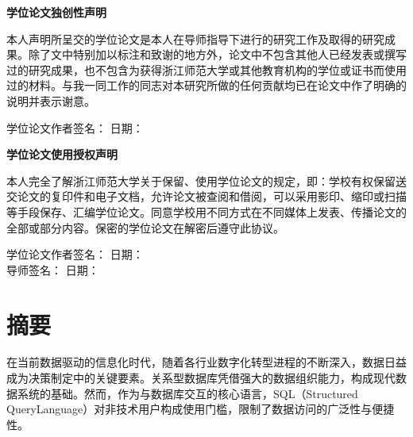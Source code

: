 \documentclass[12pt,a4paper,openright,UTF8]{ctexbook}
\begin{document}
\newpage
\thispagestyle{empty}
\begin{center}
    {\bfseries 学位论文独创性声明}
\end{center}
\vspace{1cm}
本人声明所呈交的学位论文是本人在导师指导下进行的研究工作及取得的研究成果。除了文中特别加以标注和致谢的地方外，论文中不包含其他人已经发表或撰写过的研究成果，也不包含为获得浙江师范大学或其他教育机构的学位或证书而使用过的材料。与我一同工作的同志对本研究所做的任何贡献均已在论文中作了明确的说明并表示谢意。
\vspace{2cm}
\begin{flushright}
    学位论文作者签名：\underline{\hspace{4cm}} \quad 日期：\underline{\hspace{3cm}}
\end{flushright}

\newpage
\thispagestyle{empty}
\begin{center}
    {\bfseries 学位论文使用授权声明}
\end{center}
\vspace{1cm}
本人完全了解浙江师范大学关于保留、使用学位论文的规定，即：学校有权保留送交论文的复印件和电子文档，允许论文被查阅和借阅，可以采用影印、缩印或扫描等手段保存、汇编学位论文。同意学校用不同方式在不同媒体上发表、传播论文的全部或部分内容。保密的学位论文在解密后遵守此协议。
\vspace{2cm}
\begin{flushright}
    学位论文作者签名：\underline{\hspace{4cm}} \quad 日期：\underline{\hspace{3cm}} \\[1cm]
    导师签名：\underline{\hspace{4.6cm}} \quad 日期：\underline{\hspace{3cm}}
\end{flushright}

\newpage
{}
\setcounter{page}{1}


\chapter*{摘\quad 要}

在当前数据驱动的信息化时代，随着各行业数字化转型进程的不断深入，数据日益成为决策制定中的关键要素。关系型数据库凭借强大的数据组织能力，构成现代数据系统的基础。然而，作为与数据库交互的核心语言，SQL（Structured QueryLanguage）对非技术用户构成使用门槛，限制了数据访问的广泛性与便捷性。
\end{document}
